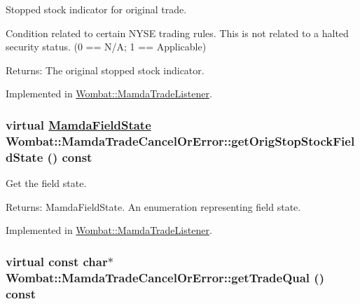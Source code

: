 Stopped stock indicator for original trade. 

Condition related to certain NYSE trading rules. This is not related to a halted security status. (0 == N/A; 1 == Applicable)

\begin{Desc}
\item[Returns:]The original stopped stock indicator. \end{Desc}


Implemented in \hyperlink{classWombat_1_1MamdaTradeListener_4a5498e32feec686f6989e3ced92a984}{Wombat::Mamda\-Trade\-Listener}.\hypertarget{classWombat_1_1MamdaTradeCancelOrError_79f84c7ff2fee996c7cb5e6472dbe471}{
\subsubsection[getOrigStopStockFieldState]{\setlength{\rightskip}{0pt plus 5cm}virtual \hyperlink{namespaceWombat_93aac974f2ab713554fd12a1fa3b7d2a}{Mamda\-Field\-State} Wombat::Mamda\-Trade\-Cancel\-Or\-Error::get\-Orig\-Stop\-Stock\-Field\-State () const}}
\label{classWombat_1_1MamdaTradeCancelOrError_79f84c7ff2fee996c7cb5e6472dbe471}


Get the field state. 

\begin{Desc}
\item[Returns:]Mamda\-Field\-State. An enumeration representing field state. \end{Desc}


Implemented in \hyperlink{classWombat_1_1MamdaTradeListener_f877c87cdd8ba3db4e1c41f8465ed249}{Wombat::Mamda\-Trade\-Listener}.\hypertarget{classWombat_1_1MamdaTradeCancelOrError_8eb9d5cce72be475cf039ec16aac3b3a}{
\subsubsection[getTradeQual]{\setlength{\rightskip}{0pt plus 5cm}virtual const char$\ast$ Wombat::Mamda\-Trade\-Cancel\-Or\-Error::get\-Trade\-Qual () const}}
\label{classWombat_1_1MamdaTradeCancelOrError_8eb9d5cce72be475cf039ec16aac3b3a}


